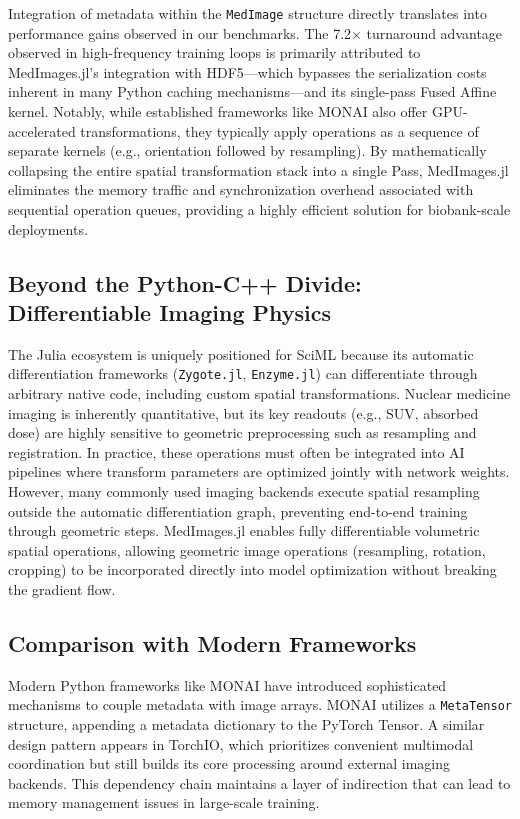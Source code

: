 \documentclass[a4paper,10pt]{elsarticle}
\begin{document}
Integration of metadata within the \texttt{MedImage} structure directly translates into performance gains observed in our benchmarks. The 7.2$\times$ turnaround advantage observed in high-frequency training loops is primarily attributed to MedImages.jl's integration with HDF5—which bypasses the serialization costs inherent in many Python caching mechanisms—and its single-pass Fused Affine kernel. Notably, while established frameworks like MONAI  \cite{KraljevicSearle2021} also offer GPU-accelerated transformations, they typically apply operations as a sequence of separate kernels (e.g., orientation followed by resampling). By mathematically collapsing the entire spatial transformation stack into a single Pass, MedImages.jl eliminates the memory traffic and synchronization overhead associated with sequential operation queues, providing a highly efficient solution for biobank-scale deployments.

\subsection*{Beyond the Python-C++ Divide: Differentiable Imaging Physics}
The Julia ecosystem is uniquely positioned for SciML because its automatic differentiation frameworks (\texttt{Zygote.jl}, \texttt{Enzyme.jl}) can differentiate through arbitrary native code, including custom spatial transformations. Nuclear medicine imaging is inherently quantitative, but its key readouts (e.g., SUV, absorbed dose) are highly sensitive to geometric preprocessing such as resampling and registration. In practice, these operations must often be integrated into AI pipelines where transform parameters are optimized jointly with network weights. However, many commonly used imaging backends execute spatial resampling outside the automatic differentiation graph, preventing end-to-end training through geometric steps. MedImages.jl enables fully differentiable volumetric spatial operations, allowing geometric image operations (resampling, rotation, cropping) to be incorporated directly into model optimization without breaking the gradient flow.

\subsection*{Comparison with Modern Frameworks}
Modern Python frameworks like MONAI  \cite{KraljevicSearle2021} have introduced sophisticated mechanisms to couple metadata with image arrays. MONAI utilizes a \texttt{MetaTensor} structure, appending a metadata dictionary to the PyTorch Tensor. A similar design pattern appears in TorchIO, which prioritizes convenient multimodal coordination but still builds its core processing around external imaging backends. This dependency chain maintains a layer of indirection that can lead to memory management issues in large-scale training.
\end{document}

